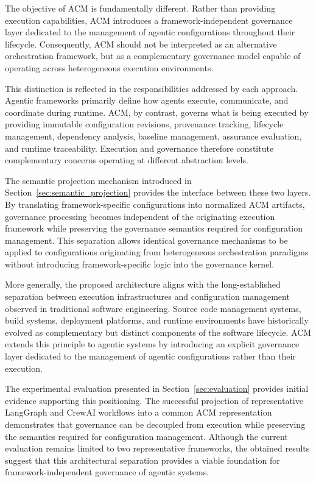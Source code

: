 \documentclass[10pt]{article}
\begin{document}
The objective of ACM is fundamentally different. Rather than providing execution capabilities, ACM introduces a framework-independent governance layer dedicated to the management of agentic configurations throughout their lifecycle. Consequently, ACM should not be interpreted as an alternative orchestration framework, but as a complementary governance model capable of operating across heterogeneous execution environments.

This distinction is reflected in the responsibilities addressed by each approach. Agentic frameworks primarily define how agents execute, communicate, and coordinate during runtime. ACM, by contrast, governs what is being executed by providing immutable configuration revisions, provenance tracking, lifecycle management, dependency analysis, baseline management, assurance evaluation, and runtime traceability. Execution and governance therefore constitute complementary concerns operating at different abstraction levels.

The semantic projection mechanism introduced in Section~\ref{sec:semantic_projection} provides the interface between these two layers. By translating framework-specific configurations into normalized ACM artifacts, governance processing becomes independent of the originating execution framework while preserving the governance semantics required for configuration management. This separation allows identical governance mechanisms to be applied to configurations originating from heterogeneous orchestration paradigms without introducing framework-specific logic into the governance kernel.

More generally, the proposed architecture aligns with the long-established separation between execution infrastructures and configuration management observed in traditional software engineering. Source code management systems, build systems, deployment platforms, and runtime environments have historically evolved as complementary but distinct components of the software lifecycle. ACM extends this principle to agentic systems by introducing an explicit governance layer dedicated to the management of agentic configurations rather than their execution.

The experimental evaluation presented in Section~\ref{sec:evaluation} provides initial evidence supporting this positioning. The successful projection of representative LangGraph and CrewAI workflows into a common ACM representation demonstrates that governance can be decoupled from execution while preserving the semantics required for configuration management. Although the current evaluation remains limited to two representative frameworks, the obtained results suggest that this architectural separation provides a viable foundation for framework-independent governance of agentic systems.
\end{document}
